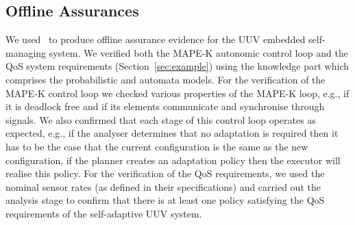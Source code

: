 \subsection{Offline Assurances}
We used \approach\ to produce offline assurance evidence for the UUV embedded self-managing system. We verified both the MAPE-K autonomic control loop and the QoS system requirements (Section~\ref{sec:example}) using the knowledge part which comprises the probabilistic and automata models. For the verification of the MAPE-K control loop we checked various properties of the MAPE-K loop, e.g., if it is deadlock free and if its elements communicate and synchronise through signals. We also confirmed that each stage of this control loop operates as expected, e.g., if the analyser determines that no adaptation is required then it has to be the case that the current configuration is the same as the new configuration, if the planner creates an adaptation policy then the executor will realise this policy. For the verification of the QoS requirements, we used the nominal sensor rates (as defined in their specifications) and carried out the analysis stage to confirm that there is at least one policy satisfying the QoS requirements of the self-adaptive UUV system.

